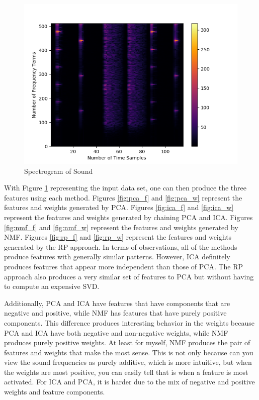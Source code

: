 \documentclass{article}[12pt]
\begin{document}
   \begin{figure}[ht]
   \centerline{
   \includegraphics[scale=1.0]{p1/spectrogram.png}}
   \caption{Spectrogram of Sound}
   \label{fig:spectro}
   \end{figure}
   
   With Figure \ref{fig:spectro} representing the input data set, one can then produce the three features using each method. Figures \ref{fig:pca_f} and \ref{fig:pca_w} represent the features and weights generated by PCA. Figures \ref{fig:ica_f} and \ref{fig:ica_w} represent the features and weights generated by chaining PCA and ICA. Figures \ref{fig:nmf_f} and \ref{fig:nmf_w} represent the features and weights generated by NMF. Figures \ref{fig:rp_f} and \ref{fig:rp_w} represent the features and weights generated by the RP approach. In terms of observations, all of the methods produce features with generally similar patterns. However, ICA definitely produces features that appear more independent than those of PCA. The RP approach also produces a very similar set of features to PCA but without having to compute an expensive SVD.
   
   Additionally, PCA and ICA have features that have components that are negative and positive, while NMF has features that have purely positive components. This difference produces interesting behavior in the weights because PCA and ICA have both negative and non-negative weights, while NMF produces purely positive weights. At least for myself, NMF produces the pair of features and weights that make the most sense. This is not only because can you view the sound frequencies as purely additive, which is more intuitive, but when the weights are most positive, you can easily tell that is when a feature is most activated. For ICA and PCA, it is harder due to the mix of negative and positive weights and feature components.
  
\end{document}
